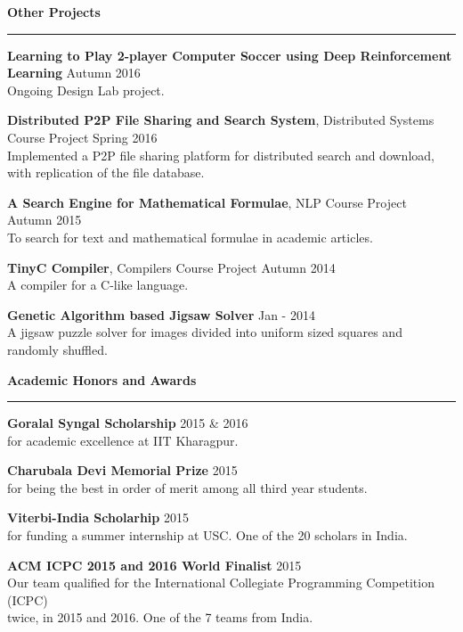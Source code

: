 \documentclass[10pt]{article}
\newcommand{\heading}[1]{
 {\large \textbf{#1}}
  \vspace{0.4em}
  \hrule
  \vspace{0.4em}
}
\newcommand{\EntryGap}{\vspace{0.5cm}}
\newcommand{\SmallEntryGap}{\vspace{0.2cm}}
\begin{document}
\heading{Other Projects}
  
  \textbf{Learning to Play 2-player Computer Soccer using Deep Reinforcement Learning} \hfill Autumn 2016\\
  Ongoing Design Lab project.
  \SmallEntryGap
  
  \textbf{Distributed P2P File Sharing and Search System}, Distributed Systems Course Project \hfill Spring 2016\\
  Implemented a P2P file sharing platform for distributed search and download,\\
  with replication of the file database.
  \SmallEntryGap
  
  \textbf{A Search Engine for Mathematical Formulae}, NLP Course Project \hfill Autumn 2015\\
  To search for text and mathematical formulae in academic articles.
  \SmallEntryGap
  
  \textbf{TinyC Compiler}, Compilers Course Project \hfill Autumn 2014\\
  A compiler for a C-like language.
  \SmallEntryGap
  
  \textbf{Genetic Algorithm based Jigsaw Solver} \hfill Jan - 2014\\
  A jigsaw puzzle solver for images divided into uniform sized squares and randomly shuffled.




\EntryGap
\heading{Academic Honors and Awards}
 
 \textbf{Goralal Syngal Scholarship} \hfill 2015 \& 2016\\
 for academic excellence at IIT Kharagpur.
 \SmallEntryGap
 
 \textbf{Charubala Devi Memorial Prize} \hfill 2015\\
  for being the best in order of merit among all third year students.
  \SmallEntryGap
  
 \textbf{Viterbi-India Scholarhip} \hfill 2015\\
  for funding a summer internship at USC. One of the 20 scholars in India.
  \SmallEntryGap
  
 \textbf{ACM ICPC 2015 and 2016 World Finalist} \hfill 2015\\
  Our team qualified for the International Collegiate Programming Competition (ICPC)\\
  twice, in 2015 and 2016. One of the 7 teams from India.
  \SmallEntryGap
  
\end{document}

